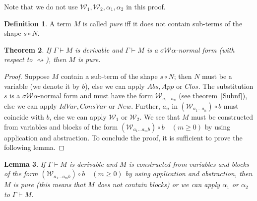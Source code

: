 \documentclass[11pt]{amsart}
\theoremstyle{plain}
\newtheorem{theorem}{Theorem}[section]
\newtheorem{lemma}[theorem]{Lemma}
\theoremstyle{definition}
\newtheorem{definition}[theorem]{Definition}
\theoremstyle{remark}
\numberwithin{equation}{section}
\newcommand{\ci}{\circ}
\newcommand{\ri}{\rightsquigarrow}
\newcommand{\x}{a}
\newcommand{\y}{b}
\renewcommand{\pi}{\mathcal{W}}
\begin{document}
Note that we do not use $\pi_1,\pi_2,\alpha_1,\alpha_2$ in this
proof.
\begin{definition}A term $M$ is called \emph{pure} iff it does not
contain sub-terms of the shape $s\ci N$.
\end{definition}
\begin{theorem}
If $\Gamma\vdash M$ is derivable and $\Gamma\vdash M$ is a
$\sigma\pi\alpha$-normal form (with respect to $\ri$), then $M$ is
pure.\label{pure}
\end{theorem}
\begin{proof}
Suppose $M$ contain a sub-term of the shape $s\ci N$; then $N$
must be a variable (we  denote it by $\y$), else we can apply
$Abs, App$ or $Clos$. The substitution $s$ is a
$\sigma\pi\alpha$-normal form  and must have the form
$\pi_{\x_1\ldots\x_n}$ (see theorem~\ref{Subnf}), else we can
apply $IdVar, ConsVar$ or $New$. Further,  $\x_n$ in
$(\pi_{\x_1\ldots\x_n})\ci \y$ must coincide with $\y$, else we
can apply $\pi_1$ or $\pi_2$. We see that $M$ must be constructed
from  variables and  blocks of the form
 $(\pi_{\x_1\ldots\x_m\y})\ci \y\quad (m\geqslant 0)$ by
using application and abstraction. To conclude the proof, it is
sufficient to prove the following lemma.
\end{proof}
\begin{lemma}
If $\Gamma\vdash M$ is derivable and $M$ is constructed from
variables and  blocks of the form $(\pi_{\x_1\ldots\x_m\y})\ci
\y\quad(m\geqslant 0)$ by using application and abstraction, then
$M$ is pure (this means that $M$ does not contain blocks) or we
can apply $\alpha_1$ or $\alpha_2$ to $\Gamma\vdash M$.
\end{lemma}
\end{document}
